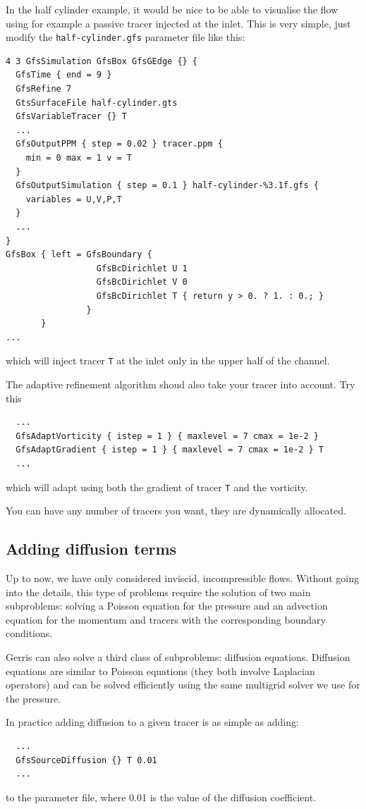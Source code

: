 \documentclass[a4paper]{article}
\begin{document}
In the half cylinder example, it would be nice to be able to visualise
the flow using for example a passive tracer injected at the inlet.
This is very simple, just modify the {\tt half-cylinder.gfs} parameter
file like this:
\begin{verbatim}
4 3 GfsSimulation GfsBox GfsGEdge {} {
  GfsTime { end = 9 }
  GfsRefine 7
  GtsSurfaceFile half-cylinder.gts
  GfsVariableTracer {} T
  ...
  GfsOutputPPM { step = 0.02 } tracer.ppm {
    min = 0 max = 1 v = T
  }
  GfsOutputSimulation { step = 0.1 } half-cylinder-%3.1f.gfs {
    variables = U,V,P,T
  }
  ...
}
GfsBox { left = GfsBoundary {
                  GfsBcDirichlet U 1
                  GfsBcDirichlet V 0
                  GfsBcDirichlet T { return y > 0. ? 1. : 0.; }
                } 
       }
...
\end{verbatim}
which will inject tracer {\tt T} at the inlet only in the upper half
of the channel.

The adaptive refinement algorithm shoud also take your tracer into account. Try this
\begin{verbatim}
  ...
  GfsAdaptVorticity { istep = 1 } { maxlevel = 7 cmax = 1e-2 }
  GfsAdaptGradient { istep = 1 } { maxlevel = 7 cmax = 1e-2 } T
  ...
\end{verbatim}
which will adapt using both the gradient of tracer {\tt T} and the vorticity.

You can have any number of tracers you want, they are dynamically
allocated.

\subsection{Adding diffusion terms}

Up to now, we have only considered inviscid, incompressible flows.
Without going into the details, this type of problems require the
solution of two main subproblems: solving a Poisson equation for the
pressure and an advection equation for the momentum and tracers with
the corresponding boundary conditions.

Gerris can also solve a third class of subproblems: diffusion
equations. Diffusion equations are similar to Poisson equations (they
both involve Laplacian operators) and can be solved efficiently using
the same multigrid solver we use for the pressure.

In practice adding diffusion to a given tracer is as simple as adding:
\begin{verbatim}
  ...
  GfsSourceDiffusion {} T 0.01
  ...
\end{verbatim}
to the parameter file, where 0.01 is the value of the diffusion
coefficient.
\end{document}
